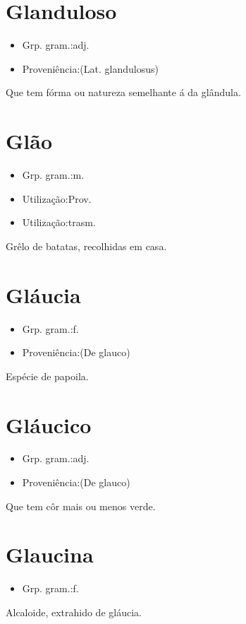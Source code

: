 \section{Glanduloso}
\begin{itemize}
\item {Grp. gram.:adj.}
\end{itemize}
\begin{itemize}
\item {Proveniência:(Lat. \textunderscore glandulosus\textunderscore )}
\end{itemize}
Que tem fórma ou natureza semelhante á da glândula.
\section{Glão}
\begin{itemize}
\item {Grp. gram.:m.}
\end{itemize}
\begin{itemize}
\item {Utilização:Prov.}
\end{itemize}
\begin{itemize}
\item {Utilização:trasm.}
\end{itemize}
Grêlo de batatas, recolhidas em casa.
\section{Gláucia}
\begin{itemize}
\item {Grp. gram.:f.}
\end{itemize}
\begin{itemize}
\item {Proveniência:(De \textunderscore glauco\textunderscore )}
\end{itemize}
Espécie de papoila.
\section{Gláucico}
\begin{itemize}
\item {Grp. gram.:adj.}
\end{itemize}
\begin{itemize}
\item {Proveniência:(De \textunderscore glauco\textunderscore )}
\end{itemize}
Que tem côr mais ou menos verde.
\section{Glaucina}
\begin{itemize}
\item {Grp. gram.:f.}
\end{itemize}
Alcaloide, extrahido de gláucia.
